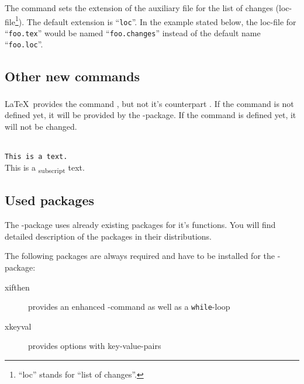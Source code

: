 


\subsubsection{}
\DescribeMacro{\setlocextension}

The command  sets the extension of the auxiliary file for the list of changes (loc-file\footnote{%
	``loc'' stands for ``list of changes''.
}).
The default extension is ``\texttt{loc}''.
In the example stated below, the loc-file for ``\texttt{foo.tex}'' would be named ``\texttt{foo.changes}'' instead of the default name ``\texttt{foo.loc}''.




\subsection{Other new commands}
\label{sec:user:other}

\subsubsection{}
\DescribeMacro{\textsubscript}

\LaTeX\ provides the command , but not it's counterpart .
If the command is not defined yet, it will be provided by the -package.
If the command is defined yet, it will not be changed.
\begin{chusage}
		\>\\
	\usageexample
		\>\texttt{This is a  text.}\\
		\>This is a \textsubscript{subscript} text.
\end{chusage}


\subsection{Used packages}
\label{sec:user:packages}

The -package uses already existing packages for it's functions.
You will find detailed description of the packages in their distributions.

The following packages are always required and have to be installed for the -package:
\begin{description}
	\item [xifthen] provides an enhanced -command as well as a \texttt{while}-loop
	\item [xkeyval] provides options with key-value-pairs
\end{description}

